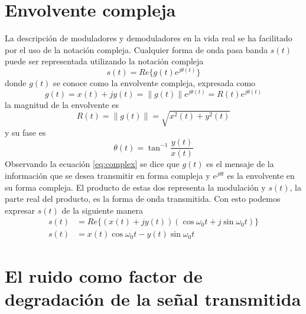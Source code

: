\section{Envolvente compleja}

La descripci\'on de moduladores y demoduladores en la vida real se ha facilitado
por el uso de la notaci\'on compleja. Cualquier forma de onda pasa banda $s(t)$ 
puede ser representada utilizando la notaci\'on compleja \cite{sklar}
\begin{equation}\label{eq:complex}
s(t)=Re\{g(t)e^{j\theta(t)}\}
\end{equation}
donde $g(t)$ se conoce como la envolvente compleja, expresada como
\begin{equation}\label{eq:comcar}
g(t)=x(t)+jy(t)=\|g(t)\|e^{j\theta(t)}=R(t)e^{j\theta(t)}
\end{equation}
la magnitud de la envolvente es
\begin{equation}\label{eq:mag}
R(t)=\|g(t)\|=\sqrt{x^2(t)+y^2(t)}
\end{equation}
y su fase es
\begin{equation}\label{eq:fase}
\theta(t)=\tan^{-1}\frac{y(t)}{x(t)}
\end{equation}
Observando la ecuaci\'on \eqref{eq:complex} se dice que $g(t)$ es el mensaje de
la informaci\'on que se desea transmitir en forma compleja y $e^{j\theta t}$ es la
envolvente en su forma compleja. El producto de estas dos representa la
modulaci\'on y $s(t)$, la parte real del producto, es la forma de onda
transmitida. Con esto podemos expresar $s(t)$ de la siguiente manera
\cite{sklar}
\begin{equation}\label{eq:compsimple}
\begin{aligned}
s(t)&=Re\{(x(t)+jy(t))(\cos\omega_0t+j\sin\omega_0t)\}\\
s(t)&=x(t)\cos\omega_0t-y(t)\sin\omega_0t
\end{aligned}
\end{equation}

\section{El ruido como factor de degradaci\'on de la se\~nal transmitida}

